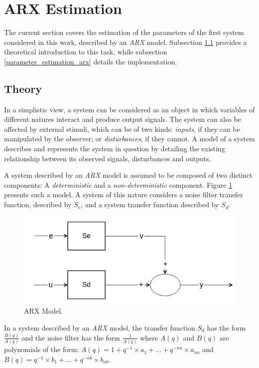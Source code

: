 \documentclass[11pt]{article}
\begin{document}
\section{ARX Estimation}
\label{arx_estimation}

The current section covers the estimation of the parameters of the first system considered in this work, described by an \emph{ARX} model. Subsection \ref{theory_arx} provides a theoretical introduction to this task, while subsection \ref{parameter_estimation_arx} details the implementation.

\subsection{Theory}
\label{theory_arx}

In a simplistic view, a system can be considered as an object in which variables of different natures interact and produce output signals. The system can also be affected by external stimuli, which can be of two kinds: \emph{inputs}, if they can be manipulated by the observer; or \emph{disturbances}, if they cannot. A model of a system describes and represents the system in question by detailing the existing relationship between its observed signals, disturbances and outputs.

A system described by an \emph{ARX} model is assumed to be composed of two distinct components: A \emph{deterministic} and a \emph{non-deterministic} component. Figure \ref{arx_model} presents such a model. A system of this nature considers a noise filter transfer function, described by $S_{e}$, and a system transfer function described by $S_{d}$.

\begin{figure}[h]
	\centering
	\includegraphics[scale=0.4]{images/arx_model.png}
	\caption{ARX Model.}
	\label{arx_model}
\end{figure}

In a system described by an \emph{ARX} model, the transfer function $S_{d}$ has the form $\frac{B(q)}{A(q)}$ and the noise filter has the form $\frac{1}{A(q)}$ where $A(q)$ and $B(q)$ are polynomials of the form: $A(q) = 1 + q^{-1} \times a_{1} + ... + q^{-na} \times a_{na}$ and $B(q) = q^{-1} \times b_{1} + ... + q^{-nb} \times b_{nb}$.
\end{document}
